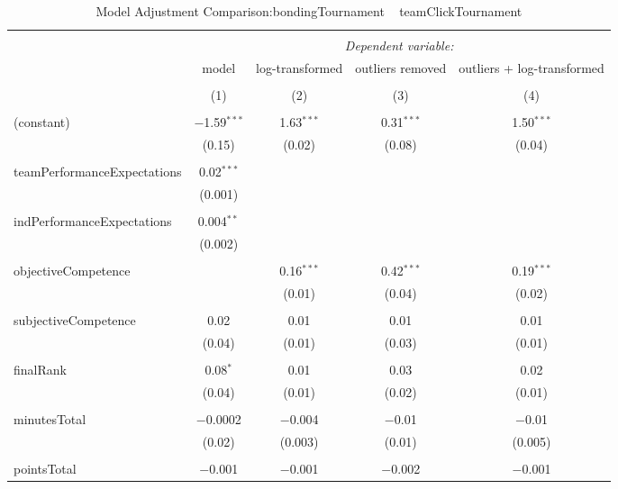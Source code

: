 
\begin{table}[!htbp] \centering 
  \caption{Model Adjustment Comparison:bondingTournament ~ teamClickTournament} 
  \label{MLM31bclickBondingTournamentModelComparison} 
\tiny 
\begin{tabular}{@{\extracolsep{5pt}}lcccc} 
\\[-1.8ex]\hline 
\hline \\[-1.8ex] 
 & \multicolumn{4}{c}{\textit{Dependent variable:}} \\ 
\cline{2-5} 
 & model & log-transformed & outliers removed & outliers + log-transformed \\ 
\\[-1.8ex] & (1) & (2) & (3) & (4)\\ 
\hline \\[-1.8ex] 
 (constant) & $-$1.59$^{***}$ & 1.63$^{***}$ & 0.31$^{***}$ & 1.50$^{***}$ \\ 
  & (0.15) & (0.02) & (0.08) & (0.04) \\ 
  & & & & \\ 
 teamPerformanceExpectations & 0.02$^{***}$ &  &  &  \\ 
  & (0.001) &  &  &  \\ 
  & & & & \\ 
 indPerformanceExpectations & 0.004$^{**}$ &  &  &  \\ 
  & (0.002) &  &  &  \\ 
  & & & & \\ 
 objectiveCompetence &  & 0.16$^{***}$ & 0.42$^{***}$ & 0.19$^{***}$ \\ 
  &  & (0.01) & (0.04) & (0.02) \\ 
  & & & & \\ 
 subjectiveCompetence & 0.02 & 0.01 & 0.01 & 0.01 \\ 
  & (0.04) & (0.01) & (0.03) & (0.01) \\ 
  & & & & \\ 
 finalRank & 0.08$^{*}$ & 0.01 & 0.03 & 0.02 \\ 
  & (0.04) & (0.01) & (0.02) & (0.01) \\ 
  & & & & \\ 
 minutesTotal & $-$0.0002 & $-$0.004 & $-$0.01 & $-$0.01 \\ 
  & (0.02) & (0.003) & (0.01) & (0.005) \\ 
  & & & & \\ 
 pointsTotal & $-$0.001 & $-$0.001 & $-$0.002 & $-$0.001 \\ 

\end{tabular}
\end{table}
